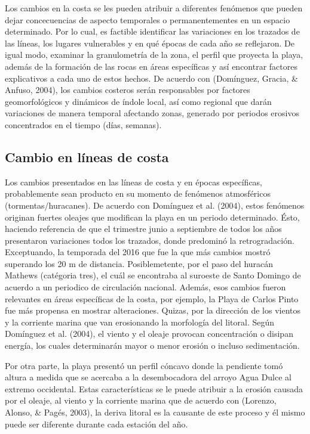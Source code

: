 \documentclass[11pt,]{article}
\begin{document}
Los cambios en la costa se les pueden atribuir a diferentes fenómenos
que pueden dejar concecuencias de aspecto temporales o permanentementes
en un espacio determinado. Por lo cual, es factible identificar las
variaciones en los trazados de las líneas, los lugares vulnerables y en
qué épocas de cada año se reflejaron. De igual modo, examinar la
granulometría de la zona, el perfil que proyecta la playa, además de la
formación de las rocas en áreas específicas y así encontrar factores
explicativos a cada uno de estos hechos. De acuerdo con (Domínguez,
Gracia, \& Anfuso, 2004), los cambios costeros serán responsables por
factores geomorfológicos y dinámicos de índole local, así como regional
que darán variaciones de manera temporal afectando zonas, generado por
periodos erosivos concentrados en el tiempo (días, semanas).

\subsection{Cambio en líneas de
costa}\label{cambio-en-luxedneas-de-costa}

Los cambios presentados en las líneas de costa y en épocas específicas,
probablemente sean producto en su momento de fenómenos atmosféricos
(tormentas/huracanes). De acuerdo con Domínguez et al. (2004), estos
fenómenos originan fuertes oleajes que modifican la playa en un periodo
determinado. Ésto, haciendo referencia de que el trimestre junio a
septiembre de todos los años presentaron variaciones todos los trazados,
donde predominó la retrogradación. Exceptuando, la temporada del 2016
que fue la que más cambios mostró superando los 20 m de distancia.
Posiblemetente, por el paso del huracán Mathews (catégoria tres), el
cuál se encontraba al suroeste de Santo Domingo de acuerdo a un
periodico de circulación nacional. Además, esos cambios fueron
relevantes en áreas específicas de la costa, por ejemplo, la Playa de
Carlos Pinto fue más propensa en mostrar alteraciones. Quizas, por la
dirección de los vientos y la corriente marina que van erosionando la
morfología del litoral. Según Domínguez et al. (2004), el viento y el
oleaje provocan concentración o disipan energía, los cuales determinarán
mayor o menor erosión o incluso sedimentación.

Por otra parte, la playa presentó un perfil cóncavo donde la pendiente
tomó altura a medida que se acercaba a la desembocadora del arroyo Agua
Dulce al extremo occidental. Estas características se le puede atribuir
a la erosión causada por el oleaje, al viento y la corriente marina que
de acuerdo con (Lorenzo, Alonso, \& Pagés, 2003), la deriva litoral es
la causante de este proceso y él mismo puede ser diferente durante cada
estación del año.
\end{document}
